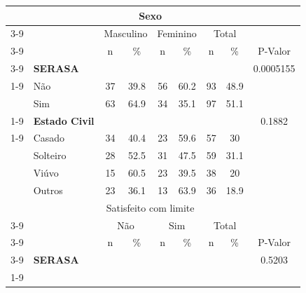 \documentclass[]{article}
\begin{document}
\begin{table}[t!]
    \centering
        \begin{tabular}{c c c c c c c c c}
            \toprule
            \midrule
                & & \multicolumn{4}{c}{Sexo}\\ \cmidrule{3-9}
                && \multicolumn{2}{c}{Masculino} & \multicolumn{2}{c}{Feminino} & \multicolumn{2}{c}{Total} \\ \cmidrule{3-9}
                && n & \% & n & \% & n & \% & P-Valor \\ \cmidrule{3-9}
                \multicolumn{1}{c}{\multirow{5}{*}}   &
                \multicolumn{1}{l}{\textbf{SERASA}} &  &  &  & & &  & 0.0005155 \\ \cmidrule{1-9}
                \multicolumn{1}{c}{}    &
                \multicolumn{1}{l}{Não} & 37 & 39.8 & 56 & 60.2 & 93 & 48.9 &  \\
                \multicolumn{1}{c}{}    &
                \multicolumn{1}{l}{Sim}& 63 & 64.9 & 34 & 35.1 & 97 & 51.1  \\ \cmidrule{1-9} &
                \multicolumn{1}{l}{\textbf{Estado Civil}} &  &  &  & & &  & 0.1882 \\ \cmidrule{1-9}                
                \multicolumn{1}{c}{}    &
                \multicolumn{1}{l}{Casado} & 34 & 40.4 & 23 & 59.6 & 57 & 30 &  \\
                \multicolumn{1}{c}{}    &   
                \multicolumn{1}{l}{Solteiro} & 28 & 52.5 & 31 & 47.5 & 59 & 31.1 &  \\
                \multicolumn{1}{c}{}    &
                \multicolumn{1}{l}{Viúvo} & 15 & 60.5 & 23 & 39.5 & 38 & 20   \\
                \multicolumn{1}{c}{}    &
                \multicolumn{1}{l}{Outros} & 23 & 36.1 & 13 & 63.9& 36 & 18.9   \\  
                \toprule
                \midrule 
                & & \multicolumn{4}{c}{Satisfeito com limite}\\ \cmidrule{3-9}
                && \multicolumn{2}{c}{Não} & \multicolumn{2}{c}{Sim} & \multicolumn{2}{c}{Total}  \\ \cmidrule{3-9}
                && n & \% & n & \% & n & \% & P-Valor \\ \cmidrule{3-9}
                \multicolumn{1}{c}{\multirow{5}{*}}   &
                \multicolumn{1}{l}{\textbf{SERASA}} &  &  &  & & &  & 0.5203 \\ \cmidrule{1-9}
                \multicolumn{1}{c}{}    &

\end{tabular}
\end{table}
\end{document}
